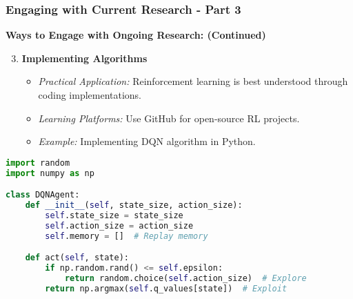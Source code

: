\documentclass[aspectratio=169]{beamer}
\begin{document}
\begin{frame}[fragile]
    \frametitle{Engaging with Current Research - Part 3}
    
    \textbf{Ways to Engage with Ongoing Research: (Continued)}
    
    \begin{enumerate}
        \setcounter{enumi}{2}
        \item \textbf{Implementing Algorithms}
        \begin{itemize}
            \item \textit{Practical Application:} Reinforcement learning is best understood through coding implementations.
            \item \textit{Learning Platforms:} Use GitHub for open-source RL projects.
            \item \textit{Example:} Implementing DQN algorithm in Python.
        \end{itemize}
    \end{enumerate}
    \begin{lstlisting}[language=Python]
import random
import numpy as np

class DQNAgent:
    def __init__(self, state_size, action_size):
        self.state_size = state_size
        self.action_size = action_size
        self.memory = []  # Replay memory

    def act(self, state):
        if np.random.rand() <= self.epsilon:
            return random.choice(self.action_size)  # Explore
        return np.argmax(self.q_values[state])  # Exploit
    \end{lstlisting}
\end{frame}
\end{document}
